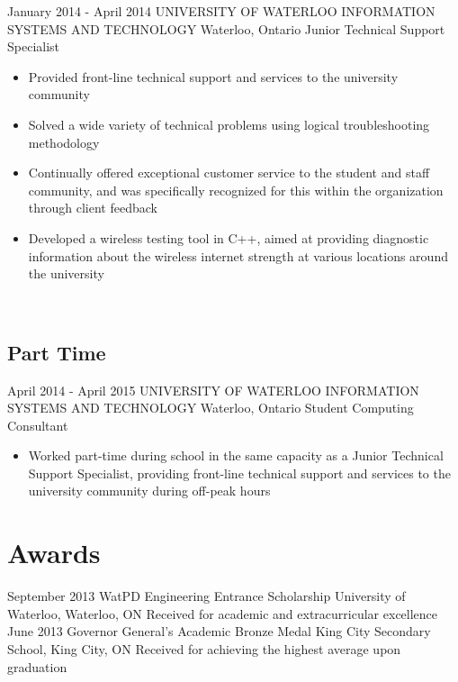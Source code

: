 \documentclass[hidelinks]{kkurucz-cv}
\begin{document}
\begin{entrylist}
\entry
{January 2014 - April 2014}
{UNIVERSITY OF WATERLOO INFORMATION SYSTEMS AND TECHNOLOGY}
{Waterloo, Ontario}
{Junior Technical Support Specialist}
{
\begin{itemize}
	\item Provided front-line technical support and services to the university community
	\item Solved a wide variety of technical problems using logical troubleshooting methodology
	\item Continually offered exceptional customer service to the student and staff community, and was specifically recognized for this within the organization through client feedback
	\item Developed a wireless testing tool in C++, aimed at providing diagnostic information about the wireless internet strength at various locations around the university
\end{itemize}
}
\end{entrylist}
\\
\subsection{Part Time}

\begin{entrylist}
\entry
{April 2014 - April 2015}
{UNIVERSITY OF WATERLOO INFORMATION SYSTEMS AND TECHNOLOGY}
{Waterloo, Ontario}
{Student Computing Consultant}
{
\begin{itemize}
	\item Worked part-time during school in the same capacity as a Junior Technical Support Specialist, providing front-line technical support and services to the university community during off-peak hours
\end{itemize}
}
\end{entrylist}


\section{Awards}

\begin{entrylist}
\entry
{September 2013}
{WatPD Engineering Entrance Scholarship}
{University of Waterloo, Waterloo, ON}
{Received for academic and extracurricular excellence}
{\null}
\entry
{June 2013}
{Governor General's Academic Bronze Medal}
{King City Secondary School, King City, ON}
{Received for achieving the highest average upon graduation}
{\null}
\end{entrylist}
\end{document}
